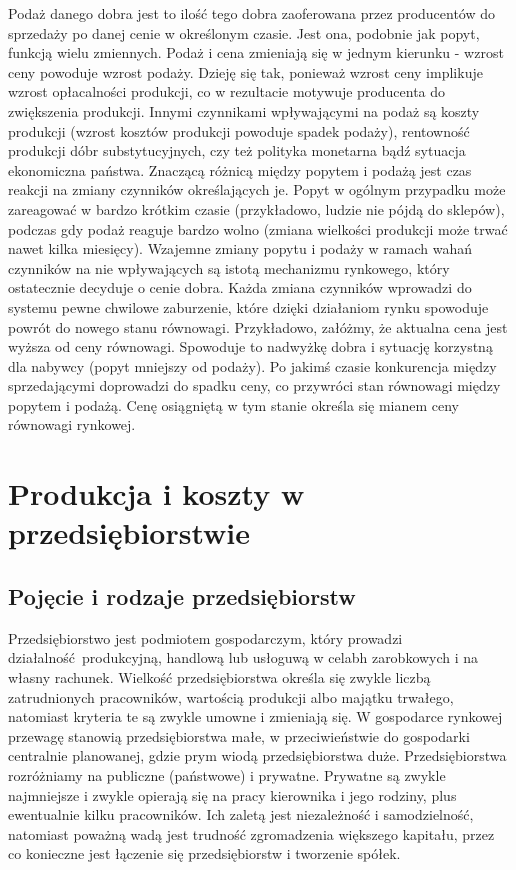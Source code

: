 \documentclass[12pt]{extarticle}
\begin{document}
Podaż danego dobra jest to ilość tego dobra zaoferowana przez producentów do sprzedaży po danej cenie w określonym czasie. Jest ona, podobnie jak popyt, funkcją wielu zmiennych. Podaż i cena zmieniają się w jednym kierunku - wzrost ceny powoduje wzrost podaży. Dzieję się tak, ponieważ wzrost ceny implikuje wzrost opłacalności produkcji, co w rezultacie motywuje producenta do zwiększenia produkcji. Innymi czynnikami wpływającymi na podaż są koszty produkcji (wzrost kosztów produkcji powoduje spadek podaży), rentowność produkcji dóbr substytucyjnych, czy też polityka monetarna bądź sytuacja ekonomiczna państwa. Znaczącą różnicą między popytem i podażą jest czas reakcji na zmiany czynników określających je. Popyt w ogólnym przypadku może zareagować w bardzo krótkim czasie (przykładowo, ludzie nie pójdą do sklepów), podczas gdy podaż reaguje bardzo wolno (zmiana wielkości produkcji może trwać nawet kilka miesięcy).
Wzajemne zmiany popytu i podaży w ramach wahań czynników na nie wpływających są istotą mechanizmu rynkowego, który ostatecznie decyduje o cenie dobra. Każda zmiana czynników wprowadzi do systemu pewne chwilowe zaburzenie, które dzięki działaniom rynku spowoduje powrót do nowego stanu równowagi. Przykładowo, załóżmy, że aktualna cena jest wyższa od ceny równowagi. Spowoduje to nadwyżkę dobra i sytuację korzystną dla nabywcy (popyt mniejszy od podaży). Po jakimś czasie konkurencja między sprzedającymi doprowadzi do spadku ceny, co przywróci stan równowagi między popytem i podażą. Cenę osiągniętą w tym stanie określa się mianem ceny równowagi rynkowej.



\section{Produkcja i koszty w przedsiębiorstwie}

\subsection{Pojęcie i rodzaje przedsiębiorstw}

Przedsiębiorstwo jest podmiotem gospodarczym, który prowadzi działalność produkcyjną, handlową lub usłoguwą w celabh zarobkowych i na własny rachunek. Wielkość przedsiębiorstwa określa się zwykle liczbą zatrudnionych pracowników, wartością produkcji albo majątku trwałego, natomiast kryteria te są zwykle umowne i zmieniają się. W gospodarce rynkowej przewagę stanowią przedsiębiorstwa małe, w przeciwieństwie do gospodarki centralnie planowanej, gdzie prym wiodą przedsiębiorstwa duże. Przedsiębiorstwa rozróżniamy na publiczne (państwowe) i prywatne. Prywatne są zwykle najmniejsze i zwykle opierają się na pracy kierownika i jego rodziny, plus ewentualnie kilku pracowników. Ich zaletą jest niezależność i samodzielność, natomiast poważną wadą jest trudność zgromadzenia większego kapitału, przez co konieczne jest łączenie się przedsiębiorstw i tworzenie spółek.
\end{document}
